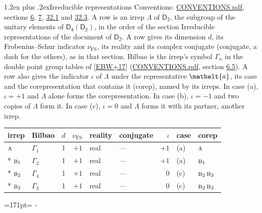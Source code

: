 \documentclass[10pt,a4paper]{article}
\makeatletter
\renewcommand\section{\@startsection{section}{1}{\z@}{-3ex plus -1ex minus -.2ex}%
  {1.2ex plus .2ex}{\normalfont\large\sffamily\bfseries\color{parttitle}}}
\newcommand{\needspace}[1]{\par\penalty-100\begingroup\dimen0=#1\relax\dimen2=\pagegoal
  \advance\dimen2-\pagetotal\ifdim\dimen0>\dimen2\relax\ifdim\dimen2>0pt\vfil\break\fi\fi
  \endgroup}
\numberwithin{equation}{section}
\newcommand{\eltfont}[1]{{\let\sigma\eltsigma\mathelt{#1}}}
\newcommand{\grp}[1]{\mathsf{#1}}
\newcommand{\irr}[1]{\text{\normalfont\scshape #1}}
\newcommand{\elt}[1]{\eltfont{#1}}
\newcommand{\fsind}{\nu_{\mathrm{FS}}}
\makeatother
\begin{document}
\section{Irreducible representations}\label{s:irreps}
Conventions: \href{../../CONVENTIONS.pdf}{CONVENTIONS.pdf}, sections \href{../../../rotation/CONVENTIONS.pdf\#conv.6}{6}, \href{../../../rotation/CONVENTIONS.pdf\#conv.7}{7}, \href{../../CONVENTIONS.pdf\#conv.32.1}{32.1} and \href{../../CONVENTIONS.pdf\#conv.32.3}{32.3}.
\leavevmode\label{n:irrep.Delta}A row is an irrep $\Lambda$ of $\grp{D_{2}}$, the subgroup of the unitary elements of $\grp{D_{4}}(\grp{D_{2}})$, in the order of the section Irreducible representations of the document of \href{../../../rotation/data/pdf/D2.pdf}{$\grp{D_{2}}$}. \label{n:index.dimension}\label{n:index.frobenius}\label{n:head.irrep}\label{n:head.reality}\label{n:head.conjugate}A row gives its dimension $d$, its Frobenius--Schur indicator $\fsind$, its reality and its complex conjugate (conjugate, a dash for the others), as in that section. \label{n:head.bilbao}\label{n:irrep.alias.gamma}Bilbao is the irrep's symbol $\Gamma_n$ in the double point group tables of [\href{../../../REFERENCES.pdf\#ref.EBW+17}{EBW+17}] (\href{../../CONVENTIONS.pdf}{CONVENTIONS.pdf}, section \href{../../../rotation/CONVENTIONS.pdf\#conv.6.5}{6.5}). \label{n:head.case.corep}\label{n:head.corep}A row also gives the indicator $\iota$ of $\Lambda$ under the representative $\elt{a}$, its case and the corepresentation that contains it (corep), named by its irreps. In case (a), $\iota = +1$ and $\Lambda$ alone forms the corepresentation. In case (b), $\iota = -1$ and two copies of $\Lambda$ form it. In case (c), $\iota = 0$ and $\Lambda$ forms it with its partner, another irrep.
\setlength{\emergencystretch}{2em}\par\setlength{\emergencystretch}{0pt}
{\small\renewcommand{\arraystretch}{1.25}\setlength{\tabcolsep}{4pt}\begin{longtable}{@{}llrrllrll@{}}\toprule
irrep & Bilbao & $d$ & $\fsind$ & reality & conjugate & $\iota$ & case & corep\\\midrule\endhead
\bottomrule\endfoot\endlastfoot
$\irr{a}$ & $\Gamma_{1}$ & 1 & $+1$ & real & --- & $+1$ & (a) & $\irr{a}$\\*
$\irr{b}_{1}$ & $\Gamma_{2}$ & 1 & $+1$ & real & --- & $+1$ & (a) & $\irr{b}_{1}$\\*
$\irr{b}_{2}$ & $\Gamma_{4}$ & 1 & $+1$ & real & --- & $0$ & (c) & $\irr{b}_{2}\,\irr{b}_{3}$\\*
$\irr{b}_{3}$ & $\Gamma_{3}$ & 1 & $+1$ & real & --- & $0$ & (c) & $\irr{b}_{2}\,\irr{b}_{3}$\\
\bottomrule\end{longtable}}
\needspace{171pt}
\end{document}
